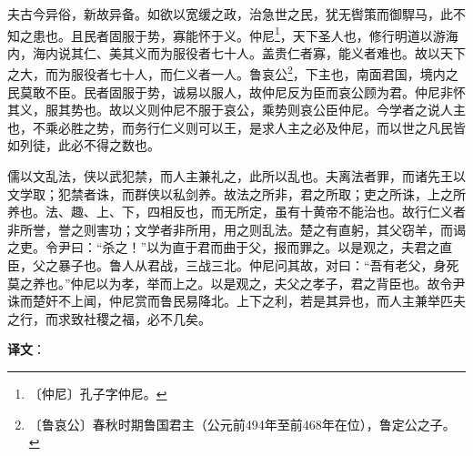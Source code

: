 \documentclass[12pt,UTF-8,openany,a4]{ctexbook}
\begin{document}
\begin{large}
    夫古今异俗，新故异备。如欲以宽缓之政，治急世之民，犹无辔策而御駻马，此不知之患也。且民者固服于势，寡能怀于义。仲尼\footnote{〔仲尼〕\yiwen 孔子字仲尼。}，天下圣人也，修行明道以游海内，海内说其仁、美其义而为服役者七十人。盖贵仁者寡，能义者难也。故以天下之大，而为服役者七十人，而仁义者一人。鲁哀公\footnote{〔鲁哀公〕\yiwen 春秋时期鲁国君主（公元前494年至前468年在位），鲁定公之子。}，下主也，南面君国，境内之民莫敢不臣。民者固服于势，诚易以服人，故仲尼反为臣而哀公顾为君。仲尼非怀其义，服其势也。故以义则仲尼不服于哀公，乘势则哀公臣仲尼。今学者之说人主也，不乘必胜之势，而务行仁义则可以王，是求人主之必及仲尼，而以世之凡民皆如列徒，此必不得之数也。
    
    儒以文乱法，侠以武犯禁，而人主兼礼之，此所以乱也。夫离法者罪，而诸先王以文学取；犯禁者诛，而群侠以私剑养。故法之所非，君之所取；吏之所诛，上之所养也。法、趣、上、下，四相反也，而无所定，虽有十黄帝不能治也。故行仁义者非所誉，誉之则害功；文学者非所用，用之则乱法。楚之有直躬，其父窃羊，而谒之吏。令尹曰：“杀之！”以为直于君而曲于父，报而罪之。以是观之，夫君之直臣，父之暴子也。鲁人从君战，三战三北。仲尼问其故，对曰：“吾有老父，身死莫之养也。”仲尼以为孝，举而上之。以是观之，夫父之孝子，君之背臣也。故令尹诛而楚奸不上闻，仲尼赏而鲁民易降北。上下之利，若是其异也，而人主兼举匹夫之行，而求致社稷之福，必不几矣。

\end{large}


\newpage

\begin{Large}
   \noindent \textbf{译文}：
\end{Large}

\vspace{1em}
\end{document}
